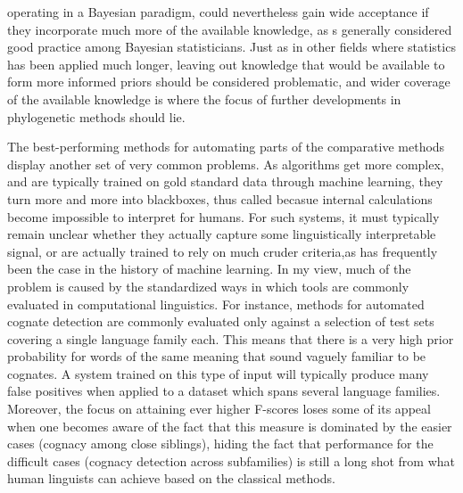 operating in a Bayesian paradigm, could nevertheless gain wide acceptance if they incorporate much more of the available knowledge, as s generally considered good practice among Bayesian statisticians. Just as in other fields where statistics has been applied much longer, leaving out knowledge that would be available to form more informed priors should be considered problematic, and wider coverage of the available knowledge is where the focus of further developments in phylogenetic methods should lie.

The best-performing methods for automating parts of the comparative methods display another set of very common problems. As algorithms get more complex, and are typically trained on gold standard data through machine learning, they turn more and more into blackboxes, thus called becasue internal calculations become impossible to interpret for humans. For such systems, it must typically remain unclear whether they actually capture some linguistically interpretable signal, or are actually trained to rely on much cruder criteria,as has frequently been the case in the history of machine learning. In my view, much of the problem is caused by the standardized ways in which tools are commonly evaluated in computational linguistics. For instance, methods for automated cognate detection are commonly evaluated only against a selection of test sets covering a single language family each. This means that there is a very high prior probability for words of the same meaning that sound vaguely familiar to be cognates. A system trained on this type of input will typically produce many false positives when applied to a dataset which spans several language families. Moreover, the focus on 
attaining ever higher F-scores loses some of its appeal when one becomes aware of the fact that this measure is dominated by the easier cases (cognacy among close siblings), hiding the fact that performance for the difficult cases (cognacy detection across subfamilies) is still a long shot from what human linguists can achieve based on the classical methods.

